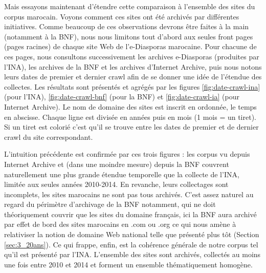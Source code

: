 \documentclass[symmetric,justified,marginals=raggedouter]{tufte-book}
\begin{document}
Mais essayons maintenant d'étendre cette comparaison à l'ensemble des sites du corpus marocain. Voyons comment ces sites ont été archivés par différentes initiatives. Comme beaucoup de ces observations devrons être faites à la main (notamment à la BNF), nous nous limitons tout d'abord aux seules front pages (pages racines) de chaque site Web de l'e-Diasporas marocaine. Pour chacune de ces pages, nous consultons successivement les archives e-Diasporas (produites par l'INA), les archives de la BNF et les archives d'Internet Archive, puis nous notons leurs dates de premier et dernier crawl afin de se donner une idée de l'étendue des collectes. Les résultats sont présentés et agrégés par les figures \ref{fig:date-crawl-ina} (pour l'INA), \ref{fig:date-crawl-bnf} (pour la BNF) et \ref{fig:date-crawl-ia} (pour Internet Archive). Le nom de domaine des sites est inscrit en ordonnée, le temps en abscisse. Chaque ligne est divisée en années puis en mois (1 mois = un tiret). Si un tiret est colorié c'est qu'il se trouve entre les dates de premier et de dernier crawl du site correspondant.

\iffalse

\begin{figure*}[hbtp]%
  \texttt{[image: graphics/date-crawl-ina]}
  \caption{Préservation des sites de l'e-Diaspora marocaine par l'INA}
  \label{fig:date-crawl-ina}
\end{figure*}

\begin{figure*}[hbtp]%
  \texttt{[image: graphics/date-crawl-bnf]}
  \caption{Préservation des sites de l'e-Diaspora marocaine par la BNF}
  \label{fig:date-crawl-bnf}
\end{figure*}

\begin{figure*}[hbtp]%
  \texttt{[image: graphics/date-crawl-ia]}
  \caption{Préservation des sites de l'e-Diaspora marocaine par Internet Archive}
  \label{fig:date-crawl-ia}
\end{figure*}

\fi

L'intuition précédente est confirmée par ces trois figures : les corpus vu depuis Internet Archive et (dans une moindre mesure) depuis la BNF couvrent naturellement une plus grande étendue temporelle que la collecte de l'INA, limitée aux seules années 2010-2014. En revanche, leurs collectages sont incomplets, les sites marocains ne sont pas tous archivés. C'est assez naturel au regard du périmètre d'archivage de la BNF notamment, qui ne doit théoriquement couvrir que les sites du domaine français, ici la BNF aura archivé par effet de bord des sites marocains en .com ou .org ce qui nous amène à relativiser la notion de domaine Web national telle que présenté plus tôt (Section \ref{sec:3_20ans}). Ce qui frappe, enfin, est la cohérence générale de notre corpus tel qu'il est présenté par l'INA. L'ensemble des sites sont archivés, collectés au moins une fois entre 2010 et 2014 et forment un ensemble thématiquement homogène. 
\end{document}
